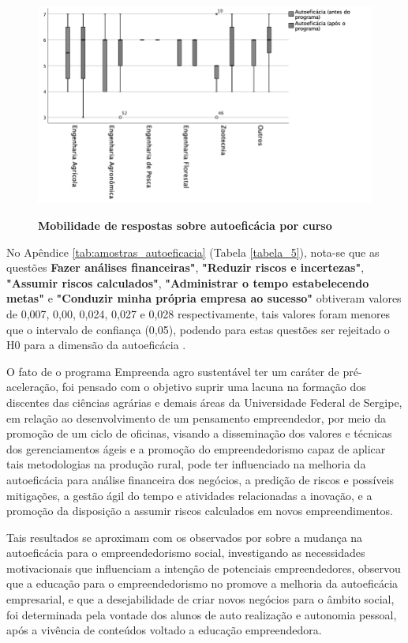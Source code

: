 \begin{figure}[H]
\centering
\caption{\textbf{Mobilidade de respostas sobre autoeficácia por curso}}
\includegraphics[scale=0.6]{Imagens/boxplot_autoeficacia.png}
\label{figura_34}
\end{figure}


No Apêndice \ref{tab:amostras_autoeficacia} (Tabela \ref{tabela_5}), nota-se que as questões \textbf{Fazer análises financeiras"}, \textbf{"Reduzir riscos e incertezas"}, \textbf{"Assumir riscos calculados"}, \textbf{"Administrar o tempo estabelecendo metas"} e \textbf{"Conduzir minha própria empresa ao sucesso"} obtiveram valores de 0,007, 0,00, 0,024, 0,027 e 0,028 respectivamente, tais valores foram menores que o intervalo de confiança (0,05), podendo para estas questões ser rejeitado o H0 para a dimensão da autoeficácia . 


O fato de o programa Empreenda agro sustentável ter um caráter de pré-aceleração, foi pensado com o objetivo suprir uma lacuna na formação dos discentes das ciências agrárias e demais áreas da Universidade Federal de Sergipe, em relação ao desenvolvimento de um pensamento empreendedor, por meio da promoção de um ciclo de oficinas, visando a disseminação dos valores e técnicas dos gerenciamentos ágeis e a promoção do empreendedorismo capaz de aplicar tais metodologias na produção rural, pode ter influenciado na melhoria da autoeficácia para análise financeira dos negócios, a predição de riscos e possíveis mitigações, a gestão ágil do tempo e atividades relacionadas a inovação, e a promoção da disposição a assumir riscos calculados em novos empreendimentos. 

Tais resultados se aproximam com os observados por  sobre a mudança na autoeficácia para o empreendedorismo social, investigando as necessidades motivacionais que influenciam a intenção de potenciais empreendedores, observou que a educação para o empreendedorismo no promove a melhoria da autoeficácia empresarial, e que a desejabilidade de criar novos negócios para o âmbito social, foi determinada pela vontade dos alunos de auto realização e autonomia pessoal, após a vivência de conteúdos voltado a educação empreendedora. 


